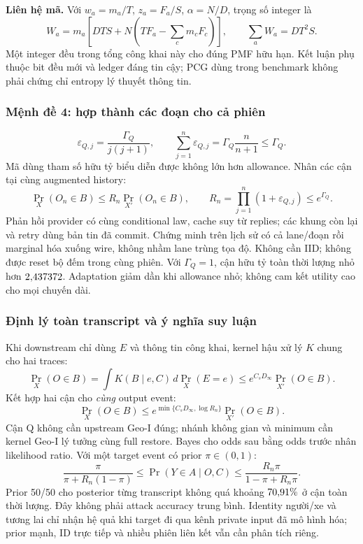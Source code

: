\textbf{Liên hệ mã.} Với $w_a=m_a/T$, $z_a=F_a/S$, $\alpha=N/D$, trọng số integer là
\[
W_a=m_a\left[DTS+N\left(TF_a-\sum_cm_cF_c\right)\right],\qquad\sum_aW_a=DT^2S.
\]
Một integer đều trong tổng công khai này cho đúng PMF hữu hạn. Kết luận phụ thuộc bit đều mới và
ledger đáng tin cậy; PCG dùng trong benchmark không phải chứng chỉ entropy lý thuyết thông tin.

\subsubsection{Mệnh đề 4: hợp thành các đoạn cho cả phiên}
\begin{equation}
\varepsilon_{Q,j}=\frac{\Gamma_Q}{j(j+1)},\qquad
\sum_{j=1}^n\varepsilon_{Q,j}=\Gamma_Q\frac{n}{n+1}\le\Gamma_Q.
\label{eq:allowance}
\end{equation}
Mã dùng tham số hữu tỷ biểu diễn được không lớn hơn allowance. Nhân các cận tại cùng augmented history:
\begin{equation}
\boxed{\Pr_X(O_n\in B)\le R_n\Pr_{X'}(O_n\in B),\qquad
R_n=\prod_{j=1}^n(1+\varepsilon_{Q,j})\le e^{\Gamma_Q}.}
\label{eq:whole}
\end{equation}
Phản hồi provider có cùng conditional law, cache suy từ replies; các khung còn lại và retry dùng bản tin đã commit.
Chứng minh trên lịch sử có cả lane/đoạn rồi marginal hóa xuống wire, không nhầm lane trùng tọa độ.
Không cần IID; không được reset bộ đếm trong cùng phiên. Với $\Gamma_Q=1$, cận hữu tỷ toàn thời lượng
nhỏ hơn $2{,}437372$. Adaptation giảm dần khi allowance nhỏ; không cam kết utility cao cho mọi chuyến dài.

\subsubsection{Định lý toàn transcript và ý nghĩa suy luận}
Khi downstream chỉ dùng $E$ và thông tin công khai, kernel hậu xử lý $K$ chung cho hai traces:
\begin{equation}
\Pr_X(O\in B)=\int K(B\mid e,C)\,d\Pr_X(E=e)
\le e^{C_sD_\infty}\Pr_{X'}(O\in B).
\label{eq:postprocessing}
\end{equation}
Kết hợp hai cận cho \emph{cùng} output event:
\begin{equation}
\boxed{\Pr_X(O\in B)\le e^{\min\{C_sD_\infty,\log R_n\}}\Pr_{X'}(O\in B).}
\label{eq:minimum}
\end{equation}
Cận Q không cần upstream Geo-I đúng; nhánh không gian và minimum cần kernel Geo-I lý tưởng cùng full restore.
Bayes cho odds sau bằng odds trước nhân likelihood ratio. Với một target event có prior $\pi\in(0,1)$:
\begin{equation}
\frac{\pi}{\pi+R_n(1-\pi)}\le\Pr(Y\in A\mid O,C)
\le\frac{R_n\pi}{1-\pi+R_n\pi}.
\label{eq:bayes}
\end{equation}
Prior 50/50 cho posterior từng transcript không quá khoảng $70{,}91\%$ ở cận toàn thời lượng.
Đây không phải attack accuracy trung bình. Identity người/xe và tương lai chỉ nhận hệ quả khi target đi qua
kênh private input đã mô hình hóa; prior mạnh, ID trực tiếp và nhiều phiên liên kết vẫn cần phân tích riêng.


